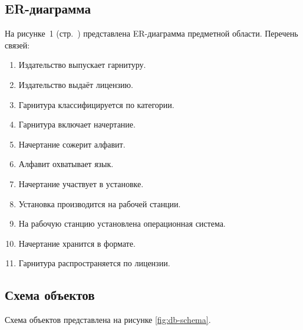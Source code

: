 \subsection{ER-диаграмма}

На рисунке~1 (стр.~\pageref{fig:er}) представлена ER-диаграмма предметной области. Перечень связей:

\begin{enumerate}
    \item Издательство выпускает гарнитуру.
    \item Издательство выдаёт лицензию.
    \item Гарнитура классифицируется по категории.
    \item Гарнитура включает начертание.
    \item Начертание сожерит алфавит.
    \item Алфавит охватывает язык.
    \item Начертание участвует в установке.
    \item Установка производится на рабочей станции.
    \item На рабочую станцию установлена операционная система.
    \item Начертание хранится в формате.
    \item Гарнитура распространяется по лицензии.
\end{enumerate}



\subsection{Схема объектов}

Схема объектов представлена на рисунке \ref{fig:db-schema}.

\addtocounter{figure}{1}

